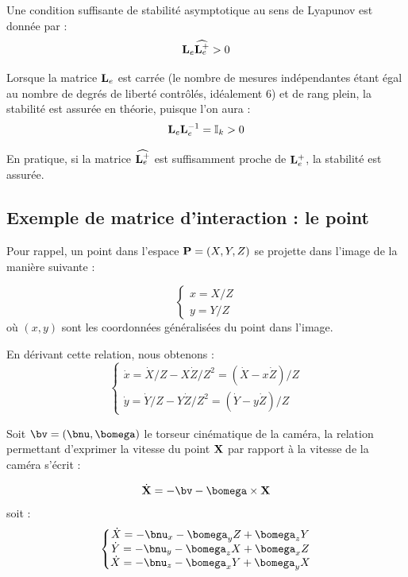 Une condition suffisante de stabilit\'e asymptotique au sens de Lyapunov est 
donn\'ee par :
\begin{equation}
{\bf L}_e \widehat {{\bf L}^+_e} > 0
\label{chap01:eq18d}
\end{equation}

Lorsque la matrice ${\bf L}_e$ est carr\'ee (le nombre de mesures 
ind\'ependantes \'etant \'egal au nombre de degr\'es de libert\'e 
contr\^ol\'es, id\'ealement 6) et de rang plein, la stabilit\'e est assur\'ee 
en th\'eorie, puisque l'on aura :
\begin{equation}
{\bf L}_e {{\bf L}^{-1}_e} = \mathbb I_k > 0
\label{chap01:eq18e}
\end{equation}

En pratique, si la matrice $\widehat {{\bf L}^+_e}$ est suffisamment proche de 
${\bf L}^+_e$, la stabilit\'e est assur\'ee.


\subsection{Exemple de matrice d'interaction : le point} \label{chap1-2-1}

Pour rappel, un point dans l'espace ${\bf P} = (X, Y, Z)$ se projette dans 
l'image de la mani\`ere suivante :

\begin{equation}
\left \lbrace
\begin{matrix}
x = X/Z \\
y = Y/Z 
\end{matrix}
\right .
\label{chap01:eq19}
\end{equation}
o\`u $(x,y)$ sont les coordonn\'ees g\'en\'eralis\'ees du point dans l'image.

En d\'erivant cette relation, nous obtenons :
\begin{equation}
\left \lbrace
\begin{matrix}
\dot x = \dot X/Z - X \dot Z/Z^2  = (\dot X - x \dot Z)/Z \\
\dot y = \dot Y/Z - Y \dot Z/Z^2  = (\dot Y - y \dot Z)/Z 
\end{matrix}
\right .
\label{chap01:eq20}
\end{equation}

Soit $\bv = (\bnu, \bomega)$ le torseur cin\'ematique de la cam\'era, la 
relation permettant d'exprimer la vitesse du point ${\bf X}$ par rapport \`a la 
vitesse de la cam\'era s'\'ecrit :

\begin{equation}
\dot {\bf X} = -\bv - \bomega \times {\bf X}
\label{chap01:eq19}
\end{equation}
soit :
\begin{equation}
\left \lbrace
\begin{matrix}
\dot X = -\bnu_x - \bomega_y Z + \bomega_z Y \\
\dot Y = -\bnu_y - \bomega_z X + \bomega_x Z \\
\dot X = -\bnu_z - \bomega_x Y + \bomega_y X \\
\end{matrix}
\right .
\label{chap01:eq21}
\end{equation}

